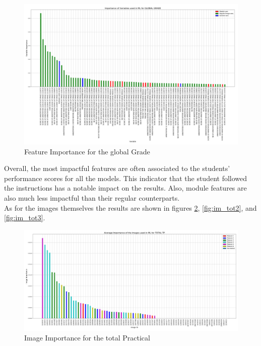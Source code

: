 \documentclass[a4paper,11pt]{report}
\numberwithin{figure}{chapter} %
\begin{document}
      \begin{figure}[H]
      \centering
      \includegraphics[width=.95\linewidth]{plots/var_importance_GLOBAL_GRADE_2018-05-02_20_56_11.png}
      \caption{Feature Importance for the global Grade}
      \label{fig:var_tot3}
      \end{figure}

    Overall, the most impactful features are often associated to the students' performance scores for all the models.
    This indicator that the student followed the instructions has a notable impact on the results.
    Also, module features are also much less impactful than their regular counterparts.\\

    As for the images themselves the results are shown in figures \ref{fig:im_tot1}, \ref{fig:im_tot2}, and \ref{fig:im_tot3}.

      \begin{figure}[H]
      \centering
      \includegraphics[width=.99\linewidth]{plots/im_importance_TOTAL_TP_2018-04-29_14_37_40.png}
      \caption{Image Importance for the total Practical}
      \label{fig:im_tot1}
      \end{figure}
\end{document}
